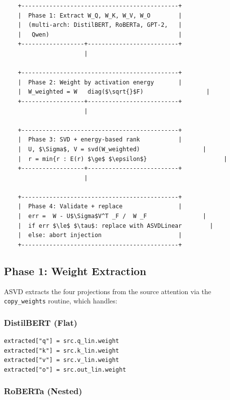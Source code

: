 \begin{lstlisting}
    +---------------------------------------------+
    |  Phase 1: Extract W_Q, W_K, W_V, W_O        |
    |  (multi-arch: DistilBERT, RoBERTa, GPT-2,   |
    |   Qwen)                                     |
    +------------------+--------------------------+
                       |
                        
    +---------------------------------------------+
    |  Phase 2: Weight by activation energy       |
    |  W_weighted = W   diag($\sqrt{}$F)                  |
    +------------------+--------------------------+
                       |
                        
    +---------------------------------------------+
    |  Phase 3: SVD + energy-based rank           |
    |  U, $\Sigma$, V = svd(W_weighted)                  |
    |  r = min{r : E(r) $\ge$ $\epsilon$}                      |
    +------------------+--------------------------+
                       |
                        
    +---------------------------------------------+
    |  Phase 4: Validate + replace                |
    |  err =  W - U$\Sigma$V^T _F /  W _F                |
    |  if err $\le$ $\tau$: replace with ASVDLinear        |
    |  else: abort injection                      |
    +---------------------------------------------+
\end{lstlisting}

\subsection{Phase 1: Weight Extraction}

ASVD extracts the four projections from the source attention via the 
\texttt{copy\_weights} routine, which handles:

\subsubsection{DistilBERT (Flat)}

\begin{lstlisting}
extracted["q"] = src.q_lin.weight
extracted["k"] = src.k_lin.weight
extracted["v"] = src.v_lin.weight
extracted["o"] = src.out_lin.weight
\end{lstlisting}

\subsubsection{RoBERTa (Nested)}

